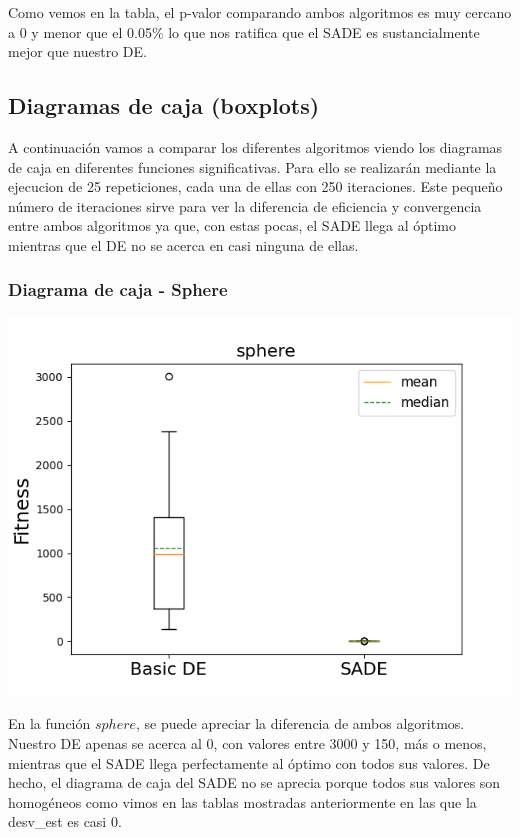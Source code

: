 \documentclass[11pt, a4paper, titlepage]{article}
\begin{document}
\vspace{5mm}

Como vemos en la tabla, el p-valor comparando ambos algoritmos es muy cercano a 0 y menor que el 0.05\% lo que nos ratifica que el SADE es sustancialmente mejor que nuestro DE.
\subsection{Diagramas de caja (boxplots)}
A continuación vamos a comparar los diferentes algoritmos viendo los diagramas de caja en diferentes funciones significativas. Para ello se realizarán mediante la ejecucion de 25 repeticiones, cada una de ellas con 250 iteraciones. Este pequeño número de iteraciones sirve para ver la diferencia de eficiencia y convergencia entre ambos algoritmos ya que, con estas pocas, el SADE llega al óptimo mientras que el DE no se acerca en casi ninguna de ellas.
\subsubsection{Diagrama de caja - Sphere}
\begin{center}
\includegraphics[scale=0.85]{sphere}
\end{center}
En la función $sphere$, se puede apreciar la diferencia de ambos algoritmos. Nuestro DE apenas se acerca al 0, con valores entre 3000 y 150, más o menos, mientras que el SADE llega perfectamente al óptimo con todos sus valores. De hecho, el diagrama de caja del SADE no se aprecia porque todos sus valores son homogéneos como vimos en las tablas mostradas anteriormente en las que la desv\_est es casi 0.
\end{document}
